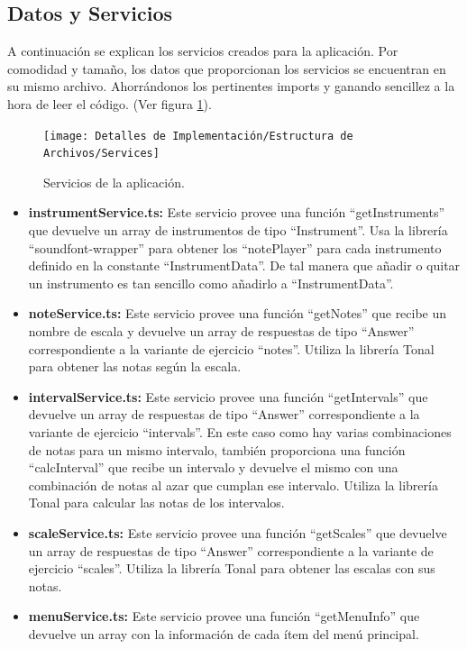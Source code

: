 \documentclass[12pt,twoside,titlepage]{report}
\begin{document}
\subsection{Datos y Servicios}
A continuación se explican los servicios creados para la aplicación. Por comodidad y tamaño, los datos que proporcionan los servicios se encuentran en su mismo archivo. Ahorrándonos los pertinentes imports y ganando sencillez a la hora de leer el código.
(Ver figura \ref{fig:Services}).

\begin{figure}[H]
    \centering
    \texttt{[image: Detalles de Implementación/Estructura de Archivos/Services]}
    \caption{Servicios de la aplicación.}
    \label{fig:Services}
\end{figure}

\begin{itemize}
    \item \textbf{instrumentService.ts:} Este servicio provee una función ``getInstruments'' que devuelve un array de instrumentos de tipo ``Instrument''. Usa la librería ``soundfont-wrapper'' para obtener los ``notePlayer'' para cada instrumento definido en la constante ``InstrumentData''. De tal manera que añadir o quitar un instrumento es tan sencillo como añadirlo a ``InstrumentData''.
    \item \textbf{noteService.ts:} Este servicio provee una función ``getNotes'' que recibe un nombre de escala y devuelve un array de respuestas de tipo ``Answer'' correspondiente a la variante de ejercicio ``notes''. Utiliza la librería Tonal para obtener las notas según la escala.
    \item \textbf{intervalService.ts:} Este servicio provee una función ``getIntervals'' que devuelve un array de respuestas de tipo ``Answer'' correspondiente a la  variante de ejercicio ``intervals''. En este caso como hay varias combinaciones de notas para un mismo intervalo, también proporciona una función ``calcInterval'' que recibe un intervalo y devuelve el mismo con una combinación de notas al azar que cumplan ese intervalo. Utiliza la librería Tonal para calcular las notas de los intervalos.
    \item \textbf{scaleService.ts:} Este servicio provee una función ``getScales'' que devuelve un array de respuestas de tipo ``Answer'' correspondiente a la  variante de ejercicio ``scales''. Utiliza la librería Tonal para obtener las escalas con sus notas.
    \item \textbf{menuService.ts:} Este servicio provee una función ``getMenuInfo'' que devuelve un array con la información de cada ítem del menú principal. 
\end{itemize}
\end{document}
